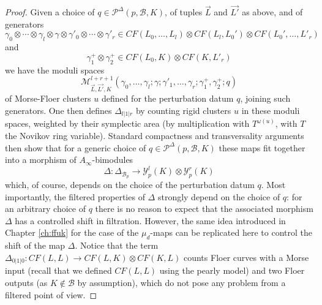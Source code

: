 \begin{proof}
Given a choice of $q\in \mathcal{P}^{\Delta}(p,\mathcal{B},K)$, of tuples $\vec{L}$ and $\vec{L'}$ as above,
 and of generators $$\gamma_0\otimes \cdots \otimes \gamma_l\otimes \gamma\otimes\gamma'_0\otimes \cdots \otimes \gamma'_r \in CF(L_0,\ldots, L_l)\otimes CF(L_l,L_0')\otimes CF(L_0',\ldots, L'_r)$$ and $$\gamma^+_1\otimes \gamma^+_2\in CF(L_0,K)\otimes CF(K,L'_r)$$ we have the moduli spaces $$\mathcal{M}^{l+r+1}_{\vec{L},\vec{L'},K}(\gamma_0,\ldots, \gamma_l;\gamma;\gamma'_1,\ldots, \gamma_r;\gamma^+_1,\gamma^+_2;q)$$ of Morse-Floer clusters $u$ defined for the perturbation datum $q$, joining such generators. One then defines $\Delta_{l|1|r}$ by counting rigid clusters $u$ in these moduli spaces, weighted by their symplectic area (by multiplication with $T^{\omega(u)}$, with $T$ the Novikov ring variable). Standard compactness and transversality arguments then show that for a generic choice of $q\in \mathcal{P}^{\Delta}(p,\mathcal{B},K)$ these maps fit together into a morphism of $A_\infty$-bimodules $$\Delta\colon \Delta_{\mathcal{B}_p}\to \mathcal{Y}^l_{p}(K)\otimes \mathcal{Y}^r_{p}(K)$$ which, of course, depends on the choice of the perturbation datum $q$. Most importantly, the filtered properties of $\Delta$ strongly depend on the choice of $q$: for an arbitrary choice of $q$ there is no reason to expect that the associated morphism $\Delta$ has a controlled shift in filtration. 
However, the same idea introduced in Chapter \ref{ch:ffuk} for the case of the $\mu_d$-maps can be replicated here to control the shift of the map $\Delta$. 
 Notice that the term $\Delta_{0|1|0}\colon CF(L,L)\to CF(L,K)\otimes CF(K,L)$ counts Floer curves with a Morse input (recall that we defined $CF(L,L)$ using the pearly model) and two Floer outputs (as $K\notin \mathcal B$ by assumption), which do not pose any problem from a filtered point of view. %

\end{proof}
